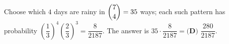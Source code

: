 Choose which $4$ days are rainy in $\dbinom74=35$ ways; each such pattern has probability $\left(\dfrac13\right)^4\left(\dfrac23\right)^3=\dfrac{8}{2187}$. The answer is $35\cdot\dfrac{8}{2187}=\boxed{\textbf{(D) }\dfrac{280}{2187}}$.
